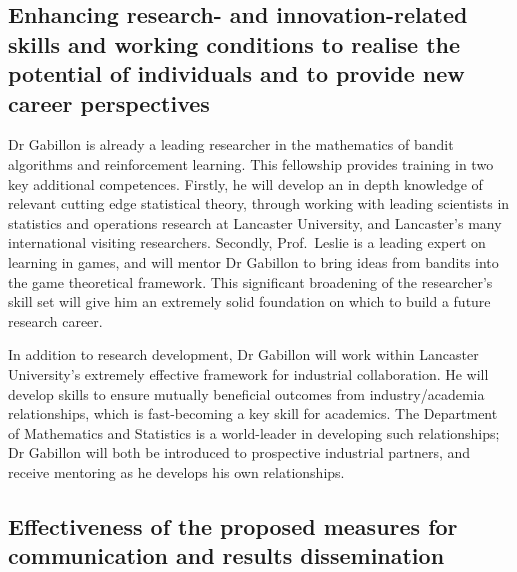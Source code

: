\documentclass[a4paper,11pt]{article}
\newcommand{\TODO}[1]{{\textcolor{red}{[\textbf{TODO:} #1]}}}
\begin{document}

\subsection{Enhancing research- and innovation-related skills and working conditions to realise the potential of individuals and to provide new career perspectives}
\label{sec:enhancement}



Dr Gabillon is already a leading researcher in the mathematics of bandit algorithms and reinforcement learning.  This fellowship provides training in two key additional competences.  Firstly, he will develop an in depth knowledge of relevant cutting edge statistical theory, through working with leading scientists in statistics and operations research at Lancaster University, and Lancaster's many international visiting researchers.   Secondly, Prof.\ Leslie is a leading expert on learning in games, and will mentor Dr Gabillon to bring ideas from bandits into the game theoretical framework.  This significant broadening of the researcher's skill set will give him an extremely solid foundation on which to build a future research career.

In addition to research development, Dr Gabillon will work within Lancaster University's extremely effective framework for industrial collaboration.  He will develop skills  to ensure mutually beneficial outcomes from industry/academia relationships, which is fast-becoming a key skill for academics. The Department of Mathematics and Statistics is  a world-leader in developing such relationships;  Dr Gabillon will both be introduced to prospective industrial partners, and receive mentoring as he develops his own relationships.


\subsection{Effectiveness of the proposed measures for communication and results dissemination}
\end{document}
